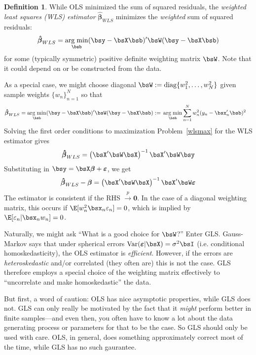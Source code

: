 \documentclass[12pt]{article}
\theoremstyle{plain}
\theoremstyle{definition}
\newtheorem{defn}[thm]{Definition}
\theoremstyle{remark}
\newcommand{\diag}{\text{diag}}
\newcommand{\bsvarepsilon}{\boldsymbol{\varepsilon}}
\newcommand{\bsbeta}{\boldsymbol{\beta}}
\newcommand{\bshatbeta}{\boldsymbol{\hat{\beta}}}
\renewcommand{\bso}{\boldsymbol{0}}
\DeclareMathOperator*{\argmin}{arg\;min}
\newcommand{\Var}{\operatorname{Var}}
\newcommand{\pto}{\xrightarrow{p}}
\newcommand{\sumnN}{\sum^N_{n=1}}
\newcommand{\nN}{_{n=1}^N}
\begin{document}
\begin{defn}
While OLS minimized the sum of squared residuals, the
\emph{weighted least squares (WLS) estimator} $\bshatbeta_{WLS}$
minimizes the \emph{weighted} sum of squared residuals:
\begin{align}
  \bshatbeta_{WLS}
  = \argmin_{\bsb}
  (\bsy - \bsX\bsb)'\bsW(\bsy - \bsX\bsb)
  \label{wlsmax}
\end{align}
for some (typically symmetric) positive definite weighting matrix
$\bsW$. Note that it could depend on or be constructed from the data.

As a special case, we might choose diagonal $\bsW :=
\diag\{w_1^2,\ldots,w_N^2\}$ given sample weights $\{w_n\}\nN$ so that
\begin{align*}
  \bshatbeta_{WLS}
  = \argmin_{\bsb}
  (\bsy - \bsX\bsb)'\bsW(\bsy - \bsX\bsb)
  :=&\; \argmin_{\bsb}
  \sumnN w_n^2(y_n - \bsx_n'\bsb)^2
\end{align*}
Solving the first order conditions to maximization Problem~\ref{wlsmax}
for the WLS estimator gives
\begin{align*}
  \bshatbeta_{WLS}
  = \left( \bsX'\bsW\bsX \right)^{-1} \bsX'\bsW \bsy
\end{align*}
Substituting in $\bsy=\bsX\bsbeta+\bsvarepsilon$, we get
\begin{align*}
  \bshatbeta_{WLS} - \bsbeta
  = \left( \bsX'\bsW\bsX \right)^{-1} \bsX'\bsW \bsvarepsilon
\end{align*}
The estimator is consistent if the RHS $\pto \bso$.
In the case of a diagonal weighting matrix, this occurs if
$\E[w_n^2\bsx_n\varepsilon_n]=0$, which is implied by
$\E[\varepsilon_n|\bsx_nw_n]=0$.
\end{defn}

Naturally, we might ask ``What is a good choice for $\bsW$?'' Enter GLS.
Gauss-Markov says that under spherical errors
$\Var(\bsvarepsilon|\bsX)=\sigma^2\bsI$ (i.e. conditional
homoskedasticity), the OLS estimator is \emph{efficient}. However, if
the errors are \emph{heteroskedastic} and/or correlated (they often are)
this is not the case. GLS therefore employs a special choice of the
weighting matrix effectively to ``uncorrelate and make homoskedastic''
the data.

But first, a word of caution: OLS has nice asymptotic properties, while
GLS does not. GLS can only really be motivated by the fact that it
\emph{might} perform better in finite samples---and even then, you often
have to know a lot about the data generating process or parameters for
that to be the case. So GLS should only be used with care. OLS, in
general, does something approximately correct most of the time, while
GLS has no such gaurantee.
\end{document}
